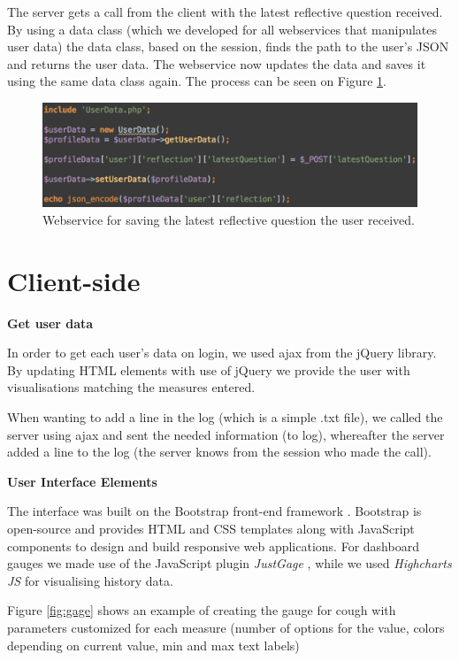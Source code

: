 The server gets a call from the client with the latest reflective question received. By using a data class (which we developed for all webservices that manipulates user data) the data class, based on the session, finds the path to the user's JSON and returns the user data. The webservice now updates the data and saves it using the same data class again. The process can be seen on Figure \ref{fig:webservice}.

\begin{figure}[h]
\centering
\includegraphics[scale=0.5]{images/implementation/webservice.png}
\caption{Webservice for saving the latest reflective question the user received.}
\label{fig:webservice}
\end{figure}
 
\section{Client-side}

\textbf{Get user data}

In order to get each user's data on login, we used ajax from the jQuery library. By updating HTML elements with use of jQuery we provide the user with visualisations matching the measures entered.

When wanting to add a line in the log (which is a simple .txt file), we called the server using ajax and sent the needed information (to log), whereafter the server added a line to the log (the server knows from the session who made the call).


\textbf{User Interface Elements}

The interface was built on the Bootstrap front-end framework \citep{bootstrap}. Bootstrap is open-source and provides HTML and CSS templates along with JavaScript components to design and build responsive web applications. For dashboard gauges we made use of the JavaScript plugin \textit{JustGage} \citep{justgage}, while we used \textit{Highcharts JS} \citep{highcharts} for visualising history data. 

Figure \ref{fig:gage} shows an example of creating the gauge for cough with parameters customized for each measure (number of options for the value, colors depending on current value, min and max text labels) 

